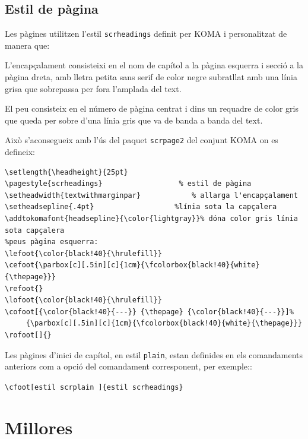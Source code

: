 \documentclass[a4paper,
                             twoside,
                             BCOR1.0cm,
                             DIV11,
                             parskip=full,
                             11pt]{scrbook}
\begin{document}
\section{Estil de pàgina} \label{sec:estilspag}
Les pàgines utilitzen l'estil \verb+scrheadings+ definit per KOMA i personalitzat de manera que:
\begin{objectives}%
\item  L'encapçalament consisteixi en el nom de capítol a la pàgina esquerra i secció a la pàgina dreta, amb lletra petita sans serif de color negre subratllat amb una línia grisa que sobrepassa per fora l'amplada del text.
\item  El peu consisteix en el número de pàgina centrat i dins un requadre de color gris que queda per sobre d'una línia gris que va de banda a banda del text.
\end{objectives}
Això s'aconsegueix amb l'ús del paquet \verb+scrpage2+ del conjunt KOMA on es defineix:
\begin{tiny}
\begin{verbatim}
\setlength{\headheight}{25pt}	      		   
\pagestyle{scrheadings}			         % estil de pàgina
\setheadwidth{textwithmarginpar}	    	% allarga l'encapçalament
\setheadsepline{.4pt}					%línia sota la capçalera
\addtokomafont{headsepline}{\color{lightgray}}% dóna color gris línia sota capçalera
%peus pàgina esquerra:
\lefoot{\color{black!40}{\hrulefill}}
\cefoot{\parbox[c][.5in][c]{1cm}{\fcolorbox{black!40}{white}{\thepage}}}
\refoot{}
\lofoot{\color{black!40}{\hrulefill}}
\cofoot[{\color{black!40}{---}} {\thepage} {\color{black!40}{---}}]%
     {\parbox[c][.5in][c]{1cm}{\fcolorbox{black!40}{white}{\thepage}}}
\rofoot[]{}
\end{verbatim}
\end{tiny}
Les pàgines d'inici de capítol, en estil \verb+plain+, estan definides en els comandaments anteriors com a opció del comandament corresponent, per exemple::

\begin{scriptsize}\verb+\cfoot[estil scrplain ]{estil scrheadings}+\end{scriptsize}


\chapter{Millores}\label{cap:millores}
\end{document}
